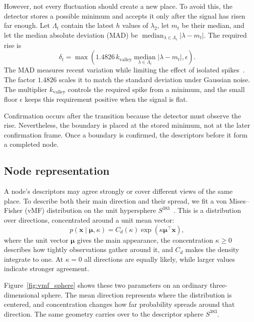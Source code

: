 \documentclass[5p,twocolumn,nonatbib,reversenotenum]{elsarticle}
\begin{document}
However, not every fluctuation should create a new place. To avoid this, the detector stores a possible minimum and accepts it only after the signal has risen far enough. Let $\Lambda_t$ contain the latest $h$ values of $\lambda_2$, let $m_t$ be their median, and let the median absolute deviation (MAD) be $\operatorname*{median}_{\lambda\in\Lambda_t}|\lambda-m_t|$. The required rise is
\begin{equation}
    \delta_t=\max\!\left(
    1.4826\,k_{\mathrm{valley}}
    \operatorname*{median}_{\lambda\in\Lambda_t}|\lambda-m_t|,
    \epsilon\right).
\end{equation}
The MAD measures recent variation while limiting the effect of isolated spikes~\cite{Rousseeuw1993}. The factor $1.4826$ scales it to match the standard deviation under Gaussian noise. The multiplier $k_{\mathrm{valley}}$ controls the required spike from a minimum, and the small floor $\epsilon$ keeps this requirement positive when the signal is flat.

Confirmation occurs after the transition because the detector must observe the rise. Nevertheless, the boundary is placed at the stored minimum, not at the later confirmation frame. Once a boundary is confirmed, the descriptors before it form a completed node.

\subsection{Node representation}
A node's descriptors may agree strongly or cover different views of the same place. To describe both their main direction and their spread, we fit a von Mises--Fisher (vMF) distribution on the unit hypersphere $S^{383}$~\cite{Mardia2000Directional}. This is a distribution over directions, concentrated around a unit mean vector:
\begin{equation}
    p(\mathbf{x}\mid\boldsymbol{\mu},\kappa)
    =C_d(\kappa)\exp\!\left(\kappa\boldsymbol{\mu}^{\top}\mathbf{x}\right),
\end{equation}
where the unit vector $\boldsymbol{\mu}$ gives the main appearance, the concentration $\kappa\geq0$ describes how tightly observations gather around it, and $C_d$ makes the density integrate to one. At $\kappa=0$ all directions are equally likely, while larger values indicate stronger agreement.

Figure~\ref{fig:vmf_sphere} shows these two parameters on an ordinary three-dimensional sphere. The mean direction represents where the distribution is centered, and concentration changes how far probability spreads around that direction. The same geometry carries over to the descriptor sphere $S^{383}$.
\end{document}
